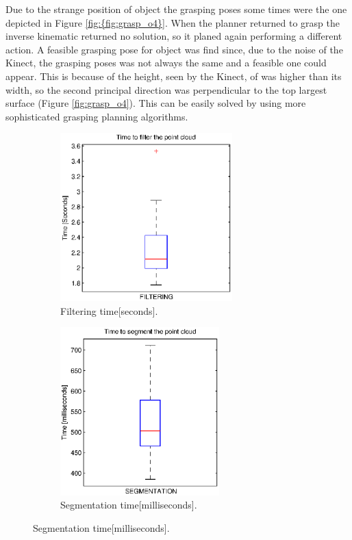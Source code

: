 Due to the strange position of object  the grasping poses some times were the one depicted in Figure \ref{fig:{fig:grasp_o4}}. When the planner returned to grasp  the inverse kinematic returned no solution, so it planed again performing a different action. A feasible grasping pose for object  was find since, due to the noise of the Kinect, the grasping poses was not always the same and a feasible one could appear. This is because of the height, seen by the Kinect, of  was higher than its width, so the second principal direction was perpendicular to the top largest surface (Figure \ref{fig:grasp_o4}). This can be easily solved by using more sophisticated grasping planning algorithms. 


\begin{figure}[tb]
\centering
\begin{subfigure}[t]{0.4\textwidth}
\centering
\includegraphics[height=6.5cm]{Img/experiments/exp_good/data/filtering.eps}
\caption{Filtering time[seconds].}
\end{subfigure}
\begin{subfigure}[t]{0.4\textwidth}
\centering
\includegraphics[height=6.5cm]{Img/experiments/exp_good/data/segmentation.eps}
\caption{Segmentation time[milliseconds].}
\end{subfigure}

\end{figure}

